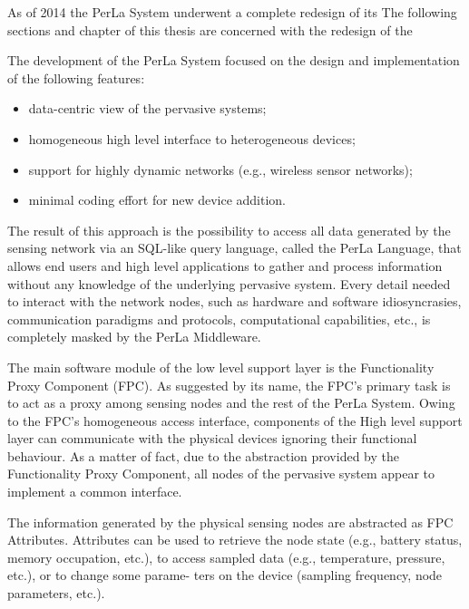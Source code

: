 As of 2014 the PerLa System underwent a complete redesign of its 
The following sections and chapter of this thesis are concerned with the
redesign of the 

The development of the PerLa System focused on the design and implementation of
the following features:

\begin{itemize}

    \item data-centric view of the pervasive systems;

    \item homogeneous high level interface to heterogeneous
    devices;

    \item support for highly dynamic networks (e.g., wireless
    sensor networks);

    \item minimal coding effort for new device addition.

\end{itemize}

The result of this approach is the possibility to access all data generated by
the sensing network via an SQL-like query language, called the PerLa Language,
that allows end users and high level applications to gather and process
information without any knowledge of the underlying pervasive system. Every
detail needed to interact with the network nodes, such as hardware and software
idiosyncrasies, communication paradigms and protocols, computational
capabilities, etc., is completely masked by the PerLa Middleware.

The main software module of the low level support layer is the Functionality
Proxy Component (FPC). As suggested by its name, the FPC’s primary task is to
act as a proxy among sensing nodes and the rest of the PerLa System. Owing to
the FPC’s homogeneous access interface, components of the High level support
layer can communicate with the physical devices ignoring their functional
behaviour. As a matter of fact, due to the abstraction provided by the
Functionality Proxy Component, all nodes of the pervasive system appear to
implement a common interface.

The information generated by the physical sensing nodes are abstracted as FPC
Attributes. Attributes can be used to retrieve the node state (e.g., battery
status, memory occupation, etc.), to access sampled data (e.g., temperature,
pressure, etc.), or to change some parame- ters on the device (sampling
frequency, node parameters, etc.). 

